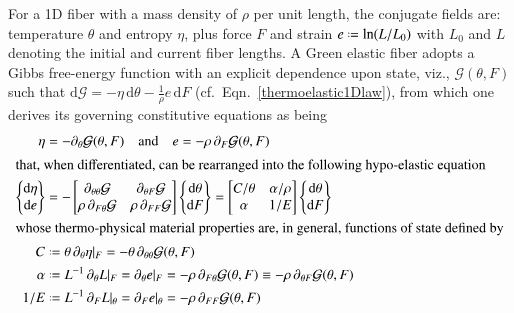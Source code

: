 For a 1D fiber with a mass density of $\rho$ per unit length, the conjugate fields are: temperature $\theta$ and entropy $\eta$, plus force $F$ and strain $e \defeq \ln (L/L_0)$ with $L_0$ and $L$ denoting the initial and current fiber lengths.  A Green elastic fiber adopts a Gibbs free-energy function with an explicit dependence upon state, viz., $\mathcal{G} (\theta , F)$ such that $\mathrm{d} \mathcal{G} = -\eta \, \mathrm{d} \theta - \tfrac{1}{\rho} e \, \mathrm{d}F$ (cf.~Eqn.~\ref{thermoelastic1Dlaw}), from which one derives its governing constitutive equations as being
\begin{subequations}
    \label{fiberConstitutiveTheory}
    \begin{align}
\eta & = -\partial_{\theta} \mathcal{G} (\theta , F)
\quad \text{and} \quad
e = -\rho \, \partial_F \mathcal{G} (\theta, F)
\label{entropyStrain1D} \\
\intertext{that, when differentiated, can be rearranged into the following hypo-elastic equation}
\left\{ \begin{matrix}
\mathrm{d} \eta \\ \mathrm{d} e 
\end{matrix} \right\} & = -\begin{bmatrix}
\partial_{\theta\theta} \mathcal{G} & \partial_{\theta F} \mathcal{G} \\
\rho \, \partial_{F\theta} \mathcal{G} & \rho \, \partial_{FF} \mathcal{G}
\end{bmatrix} 
\left\{ \begin{matrix}
\mathrm{d} \theta \\ \mathrm{d} F
\end{matrix} \right\}
= \begin{bmatrix}
C / \theta & \alpha / \rho \\
\alpha & 1 / E
\end{bmatrix}
\left\{ \begin{matrix}
\mathrm{d} \theta \\ \mathrm{d} F
\end{matrix} \right\}
\label{thermoelasticCE1D} \\
    \intertext{whose thermo-physical material properties are, in general, functions of state defined by}
    C & \defeq \theta \, \partial_{\theta} \eta |_F = 
    -\theta \, \partial_{\theta\theta} \mathcal{G} (\theta , F)
    \label{specificHeat} \\
    \alpha & \defeq L^{-1} \, \partial_{\theta} L |_F = \partial_{\theta} e |_F =
    -\rho \, \partial_{F\theta} \mathcal{G} (\theta , F) \equiv
    -\rho \, \partial_{\theta F} \mathcal{G} (\theta , F)
    \label{thermalExpansion} \\
    1 / E & \defeq L^{-1} \, \partial_F L |_{\theta} = \partial_F e |_{\theta} =
    -\rho \, \partial_{FF} \mathcal{G} (\theta , F)
    \label{compliance}
    \end{align}
\end{subequations}
